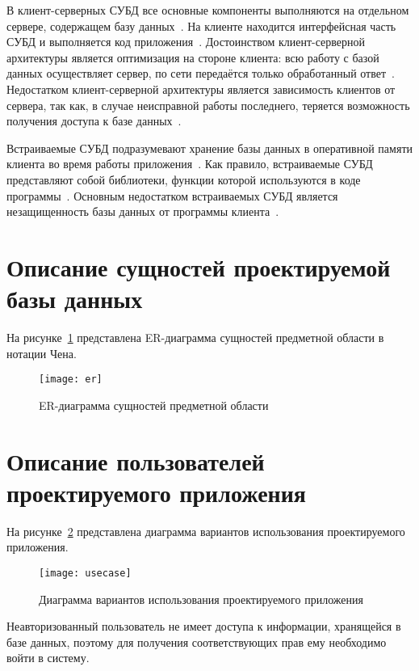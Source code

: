 В клиент-серверных СУБД все основные компоненты выполняются на отдельном сервере, содержащем базу данных~\cite{dbmsu}.
На клиенте находится интерфейсная часть СУБД и выполняется код приложения~\cite{dbmsu}.
Достоинством клиент-серверной архитектуры является оптимизация на стороне клиента: всю работу с базой данных осуществляет сервер, по сети передаётся только обработанный ответ~\cite{dbmsu}.
Недостатком клиент-серверной архитектуры является зависимость клиентов от сервера, так как, в случае неисправной работы последнего, теряется возможность получения доступа к базе данных~\cite{dbmsu}.

Встраиваемые СУБД подразумевают хранение базы данных в оперативной памяти клиента во время работы приложения~\cite{dbmsu}.
Как правило, встраиваемые СУБД представляют собой библиотеки, функции которой используются в коде программы~\cite{dbmsu}.
Основным недостатком встраиваемых СУБД является незащищенность базы данных от программы клиента~\cite{dbmsu}.

\section[Описание сущностей проектируемой базы данных]{Описание сущностей проектируемой\\базы данных}

На рисунке~\ref{er} представлена ER-диаграмма сущностей предметной области в нотации Чена.
\begin{figure}[H]
	\centering
	\texttt{[image: er]}
	\caption{ER-диаграмма сущностей предметной области}
	\label{er}
\end{figure}

\section[Описание пользователей проектируемого приложения]{Описание пользователей\\проектируемого приложения}

На рисунке~\ref{usecase} представлена диаграмма вариантов использования проектируемого приложения.
\begin{figure}[H]
	\centering
	\texttt{[image: usecase]}
	\caption{Диаграмма вариантов использования проектируемого приложения}
	\label{usecase}
\end{figure}

Неавторизованный пользователь не имеет доступа к информации, хранящейся в базе данных, поэтому для получения соответствующих прав ему необходимо войти в систему.

